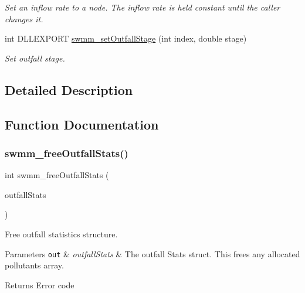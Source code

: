 \begin{DoxyCompactItemize}
\begin{DoxyCompactList}\small\item\em Set an inflow rate to a node. The inflow rate is held constant until the caller changes it. \end{DoxyCompactList}\item 
int D\+L\+L\+E\+X\+P\+O\+RT \hyperlink{group__tkfuncs_ga80d902400625073d8ff2c392365fde9b}{swmm\+\_\+set\+Outfall\+Stage} (int index, double stage)
\begin{DoxyCompactList}\small\item\em Set outfall stage. \end{DoxyCompactList}\end{DoxyCompactItemize}


\subsection{Detailed Description}


\subsection{Function Documentation}
\mbox{\label{group__tkfuncs_ga24874b7dc37c161521f0c14899c2157d}} 
\subsubsection{\texorpdfstring{swmm\+\_\+free\+Outfall\+Stats()}{swmm\_freeOutfallStats()}}
{\footnotesize\ttfamily int swmm\+\_\+free\+Outfall\+Stats (\begin{DoxyParamCaption}\item[{\hyperlink{struct_s_m___outfall_stats}{S\+M\+\_\+\+Outfall\+Stats} $\ast$}]{outfall\+Stats }\end{DoxyParamCaption})}



Free outfall statistics structure. 


\begin{DoxyParams}[1]{Parameters}
\mbox{\tt out}  & {\em outfall\+Stats} & The outfall Stats struct. This frees any allocated pollutants array. \\
\hline
\end{DoxyParams}
\begin{DoxyReturn}{Returns}
Error code 
\end{DoxyReturn}


